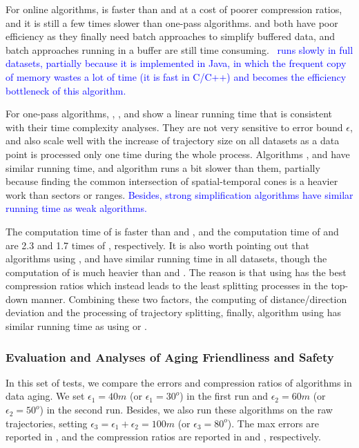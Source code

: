 {For online algorithms, \squishe is faster than \bqsa and \opwa at a cost of poorer compression ratios, and it is still a few times slower than one-pass algorithms. \bqsa and \opwa both have poor efficiency as they finally need batch approaches to simplify buffered data, and batch approaches running in a buffer are still time consuming. \textcolor{blue}{\dagots~runs slowly in full datasets, partially because it is implemented in Java, in which the frequent copy of memory wastes a lot of time (it is fast in C/C++) and becomes the efficiency bottleneck of this algorithm.}

For one-pass algorithms, \operb, \siped, \cised and \interval show a linear running time that is consistent with their time complexity analyses. They are not very sensitive to error bound $\epsilon$, and also scale well with the increase of trajectory size on all datasets as a data point is processed only one time during the whole process.
Algorithms \siped, \operb and \interval have similar running time, and algorithm \cised runs a bit slower than them, partially because finding the common intersection of spatial-temporal cones is a heavier work than sectors or ranges. 
\textcolor{blue}{Besides, strong simplification algorithms have similar running time as weak algorithms.}



The computation time of \dad is faster than \ped and \sed, and the computation time of \ped and \sed are 2.3 and 1.7 times of \dad, respectively.
{It is also worth pointing out that algorithms \dpa using \ped, \sed and \dad have similar running time in all datasets, though the computation of \ped is much heavier than \sed and \dad. The reason is that \dpa using \ped has the best compression ratios which instead leads to the least splitting processes in the top-down manner. Combining these two factors, \ie the computing of distance/direction deviation and the processing of trajectory splitting, finally, algorithm \dpa using \ped has similar running time as \dpa using \dad or \sed.}

\subsubsection{{Evaluation and Analyses of Aging Friendliness and Safety}}
\label{sec:exp-data-aging}
In this set of tests, we compare the errors and compression ratios of algorithms in data aging. We set $\epsilon_1=40m$ (or $\epsilon_1=30^o$) in the first run and $\epsilon_2=60m$ (or $\epsilon_2=50^o$) in the second run. Besides, we also run these algorithms on the raw trajectories, setting $\epsilon_3=\epsilon_1 + \epsilon_2=100m$ (or $\epsilon_3=80^o$). The max errors are reported in , and the compression ratios are reported in  and , respectively.

}
